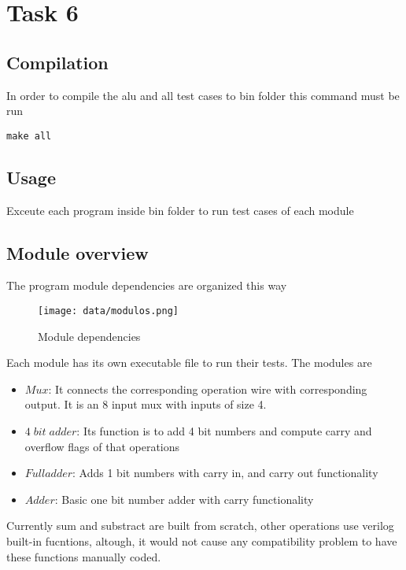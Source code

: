 
\usepackage{listings}



\section*{Task 6}

\subsection*{Compilation}
In order to compile the alu and all test cases to bin folder this command must be run
\begin{lstlisting}
make all
\end{lstlisting}

\subsection*{Usage}
Exceute each program inside bin folder to run test cases of each module

\subsection*{Module overview}
The program module dependencies are organized this way
\begin{figure}[H]
  \begin{centering}
  \texttt{[image: data/modulos.png]}
  \par\end{centering}
  \caption{Module dependencies}
\end{figure}
Each module has its own executable file to run their tests. The modules are

\begin{itemize}
  \item $Mux$: It connects the corresponding operation wire with corresponding output. It is an 8 input mux with inputs of size 4.
  \item $4\;bit\;adder$: Its function is to add 4 bit numbers and compute carry and overflow flags of that operations
  \item $Fulladder$: Adds 1 bit numbers with carry in, and carry out functionality
  \item $Adder $: Basic one bit number adder with carry functionality
\end{itemize}

Currently sum and substract are built from scratch, other operations use verilog built-in fucntions, altough, it would not cause any compatibility problem to have these functions manually coded.

